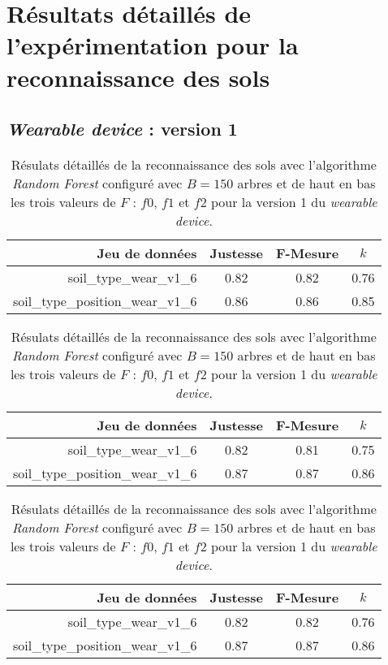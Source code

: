 \chapter{Résultats détaillés de l'expérimentation pour la reconnaissance des sols}

\section{\textit{Wearable device} : version 1}

\begin{table}[H]\renewcommand{\arraystretch}{0.5}
	\centering
	\caption{Résulats détaillés de la reconnaissance des sols avec l'algorithme \textit{Random Forest} configuré avec $B=150$ arbres et de haut en bas les trois valeurs de $F$ : $f0$, $f1$ et $f2$ pour la version 1 du \textit{wearable device}.}
	\label{tab:rf-150-wear-v1}
	\begin{tabular}{@{}rccc@{}}
		\toprule
			\textbf{Jeu de données} & \textbf{Justesse} & \textbf{F-Mesure} & \textbf{$k$} \\
		\midrule
			soil\_type\_wear\_v1\_6 & 0.82 & 0.82 & 0.76 \\
			soil\_type\_position\_wear\_v1\_6 & 0.86 & 0.86 & 0.85 \\
	\end{tabular}
	\begin{tabular}{@{}rccc@{}}
		\toprule
			\textbf{Jeu de données} & \textbf{Justesse} & \textbf{F-Mesure} & \textbf{$k$} \\
		\midrule
			soil\_type\_wear\_v1\_6 & 0.82 & 0.81 & 0.75 \\
			soil\_type\_position\_wear\_v1\_6 & 0.87 & 0.87 & 0.86 \\
	\end{tabular}
	\begin{tabular}{@{}rccc@{}}
		\toprule
			\textbf{Jeu de données} & \textbf{Justesse} & \textbf{F-Mesure} & \textbf{$k$} \\
		\midrule
			soil\_type\_wear\_v1\_6 & 0.82 & 0.82 & 0.76 \\
			soil\_type\_position\_wear\_v1\_6 & 0.87 & 0.87 & 0.86 \\
		\bottomrule
	\end{tabular}
\end{table}

